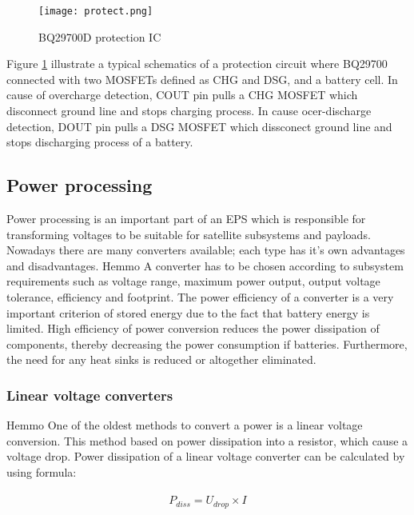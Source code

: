 \begin{figure}[h]
	\centering
	\texttt{[image: protect.png]}
	\caption{ BQ29700D protection IC \cite{17}}
	\label{fig: EPS1}
\end{figure}

Figure \ref{fig: EPS1} illustrate a typical schematics of a protection circuit where BQ29700 connected with two MOSFETs defined as CHG and DSG, and a battery cell. In cause of overcharge detection, COUT pin pulls a CHG MOSFET which disconnect ground line and stops charging process. In cause ocer-discharge detection, DOUT pin pulls a DSG MOSFET which dissconect ground line and stops discharging process of a battery.

\subsection{Power processing \label{sec:tech}}

Power processing is an important part of an EPS which is responsible for transforming voltages to be suitable for satellite subsystems and payloads. Nowadays there are many converters available; each type has it's own advantages and disadvantages. Hemmo\cite{18} A converter has to be chosen according to subsystem requirements such as voltage range, maximum power output, output voltage tolerance, efficiency and footprint. The power efficiency of a converter is a very important criterion of stored energy due to the fact that battery energy is limited. High efficiency of  power conversion reduces the power dissipation of  components, thereby decreasing the power consumption if batteries. Furthermore, the need for any heat sinks is reduced or altogether eliminated. 

\subsubsection{Linear voltage converters \label{sec:tech}}

Hemmo\cite{18} One of the oldest methods to convert a power is a linear voltage conversion. This method based on power dissipation into a resistor, which cause a voltage drop. Power dissipation of a linear voltage converter can be calculated by using formula:\\ \\

\begin{equation}\label{eq:2}
P_{diss}=U_{drop} \times I
\end{equation}


